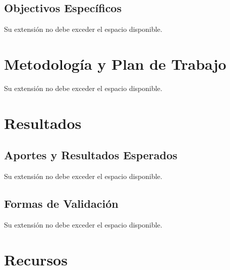 \documentclass[12pt,spanish]{article}
\begin{document}


\subsection{Objectivos Específicos}
Su extensión no debe exceder el espacio disponible.


\newpage
\section[]{Metodología y Plan de Trabajo}
Su extensión no debe exceder el espacio disponible.




\newpage
\section[]{Resultados}
\subsection{Aportes y Resultados Esperados}
Su extensión no debe exceder el espacio disponible.


\subsection{Formas de Validación}
Su extensión no debe exceder el espacio disponible.



\newpage
\section[]{Recursos}
\end{document}
